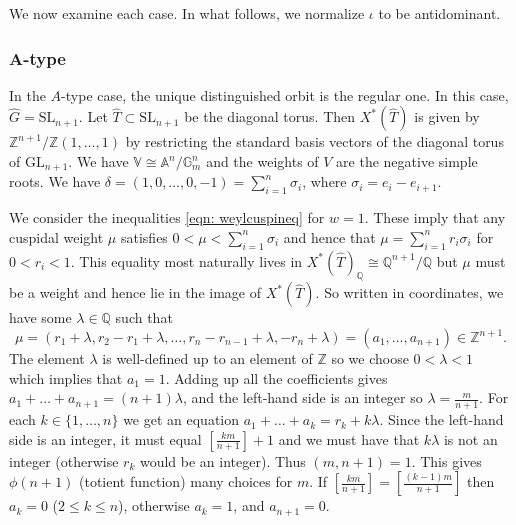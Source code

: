 \documentclass{amsart}
\theoremstyle{definition}
\theoremstyle{remark}
\numberwithin{equation}{section}
\newcommand{\Q}{\mathbb{Q}}
\newcommand{\A}{\mathbb{A}}
\newcommand{\Z}{\mathbb{Z}}
\newcommand{\SL}{\mathrm{SL}}
\newcommand{\GL}{\mathrm{GL}}
\newcommand{\wh}{\widehat}
\newcommand{\V}{\mathbb{V}}
\begin{document}
We now examine each case. In what follows, we normalize $\iota$ to be antidominant.
\subsubsection{A-type}
In the $A$-type case, the unique distinguished orbit is the regular one. In this case, $\wh{G} = \SL_{n+1}$. Let $\wh T \subset \SL_{n+1}$ be the diagonal torus. Then $X^{\ast}(\wh T)$ is given by $\Z^{n+1} / \Z(1, \dots, 1)$ by restricting the standard basis vectors of the diagonal torus of $\GL_{n+1}$. We have $\V \cong \A^n/\mathbb{G}_m^n$ and the weights of $V$ are the negative simple roots. We have $\delta=(1,0, \dots, 0, -1) = \sum\limits^{n}_{i=1} \sigma_i$, where $\sigma_i = e_i - e_{i+1}$.

We consider the inequalities \eqref{eqn: weylcuspineq} for $w=1$. These imply that any cuspidal weight $\mu$ satisfies $0<\mu< \sum\limits^n_{i=1} \sigma_i$ and hence that $\mu = \sum\limits_{i=1}^n r_i\sigma_i$ for $0<r_i<1$. This equality most naturally lives in $X^{\ast}(\wh T)_{\Q} \cong \Q^{n+1} / \Q$ but $\mu$ must be a weight and hence lie in the image of $X^{\ast}(\wh T)$. So written in coordinates, we have some $\lambda \in \Q$ such that
\begin{equation*}
    \mu = (r_1 + \lambda, r_2 -r_1 + \lambda, \dots, r_n - r_{n-1} + \lambda, -r_n + \lambda) = (a_1, \dots, a_{n+1}) \in \Z^{n+1}.
\end{equation*}
The element $\lambda$ is well-defined up to an element of $\Z$ so we choose $0<\lambda<1$ which implies that $a_1=1$.
Adding up all the coefficients gives $a_1+\dots+a_{n+1} = (n+1)\lambda$, and the left-hand side is an integer so $\lambda = \frac{m}{n+1}$. For each $k \in \{ 1, \dots, n\}$ we get an equation $a_1+\dots+a_k = r_k + k\lambda$. Since the left-hand side is an integer, it must equal $[\frac{km}{n+1}]+1$ and we must have that $k\lambda$ is not an integer (otherwise $r_k$ would be an integer). Thus $(m,n+1)=1$. This gives $\phi(n+1)$ (totient function) many choices for $m$. If $[\frac{km}{n+1}]=[\frac{(k-1)m}{n+1}]$ then $a_k=0$ ($2\leq k\leq n$), otherwise $a_k=1$, and $a_{n+1}=0$.
\end{document}
